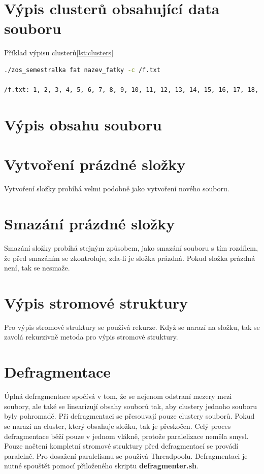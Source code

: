 \documentclass{report}
\begin{document}
\section*{Výpis clusterů obsahující data souboru}
Příklad výpisu clusterů\ref{lst:clusters}
\begin{lstlisting}[caption=Výpis clusterů obsahující data souboru,label=lst:clusters, language=bash]
./zos_semestralka fat nazev_fatky -c /f.txt

/f.txt: 1, 2, 3, 4, 5, 6, 7, 8, 9, 10, 11, 12, 13, 14, 15, 16, 17, 18, 19, 20, 21, 22, 
 \end{lstlisting}
 

\section*{Výpis obsahu souboru}


\section*{Vytvoření prázdné složky}
Vytvoření složky probíhá velmi podobně jako vytvoření nového souboru.

\section*{Smazání prázdné složky}
Smazání složky probíhá stejným způsobem, jako smazání souboru s tím rozdílem, že před smazáním se zkontroluje, zda-li je složka prázdná. Pokud složka prázdná není, tak se nesmaže.

\section*{Výpis stromové struktury}
Pro výpis stromové struktury se používá rekurze. Když se narazí na složku, tak se zavolá rekurzivně metoda pro výpis stromové struktury.

\section*{Defragmentace}
Úplná defragmentace spočívá v tom, že se nejenom odstraní mezery mezi soubory, ale také se linearizují obsahy souborů tak, aby clustery jednoho souboru byly pohromadě.
Při defragmentaci se přesouvají pouze clustery souborů. Pokud se narazí na cluster, který obsahuje složku, tak je přeskočen. Celý proces defragmentace běží pouze v jednom vlákně, protože paralelizace neměla smysl. Pouze načtení kompletní stromové struktury před defragmentací se provádí paralelně. Pro dosažení paralelismu se používá Threadpoolu. Defragmentaci je nutné spouštět pomocí přiloženého skriptu \textbf{defragmenter.sh}.
\end{document}
